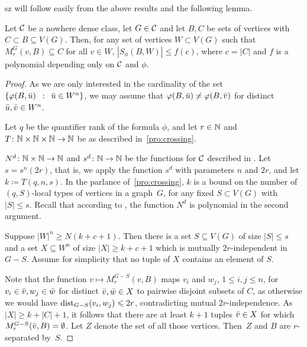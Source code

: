 \begin{change}{sz}
	 will follow easily from the above results and the following lemma.
\begin{lemma}\label{lem:num-types-same-class}
 Let $\mathcal{C}$ be a nowhere dense class,
let $G\in\mathcal{C}$ and let $B,C$ be sets of vertices with
$C\subset B\subseteq V(G)$.
Then, for any set of vertices $W\subset V(G)$ such that 
$M_r^G(v,B)\subseteq C$ for all $v\in W$, 
 $|S_\phi(B,W)|\le f(c)$, where $c=|C|$ and $f$ is a polynomial depending only on $\mathcal{C}$ and $\phi$.
\end{lemma}

\begin{proof}
As we are only interested in the cardinality of the set $\left\{\varphi(B,\bar{u}) \,~:~\, \bar{u}\in W^n \right\}$,
we may assume  that $\varphi(B,\bar{u})\neq \varphi(B,\bar{v})$ 
for distinct $\bar{u}, \bar{v}\in W^n$.


Let $q$ be the quantifier rank of the formula $\phi$,
and let $r\in \mathbb{N}$ and~$T\colon \mathbb{N}\times \mathbb{N}\times \mathbb{N}\to \mathbb{N}$  
be as described in~\cref{pro:crossing}.

$N^d\colon \mathbb{N}\times\mathbb{N}\to\mathbb{N}$ and $s^d\colon \mathbb{N}\to\mathbb{N}$ be
the functions for $\mathcal{C}$ described in . 
Let $s=s^n(2r)$, that is, we apply the function $s^d$ with
parameters $n$ and $2r$, and let $k\coloneqq T(q,n,s)$. In the parlance of~\cref{pro:crossing},
$k$ is a bound on the number of $(q,S)$-local types of vertices in a graph~$G$,
for any fixed $S\subset V(G)$ with $|S|\le s$. Recall that according
to , the function $N^d$ is polynomial in the second
argument. 

Suppose $|W|^n\geq N(k+c+1)$. Then there is a  
set $S\subseteq V(G)$ of size $|S|\leq s$ 
and a set $X\subseteq W^n$ of size $|X|\geq k+c+1$ which is 
mutually $2r$-independent in $G-S$. Assume for simplicity
that no tuple of $X$ contains an element of $S$. 

Note that the function
 $v\mapsto M_r^{G-S}(v,B)$ 
 maps $v_i$ and $w_j$, 
 $1\leq i,j\leq n$, for $v_i\in \bar{v}, w_j\in \bar{w}$ for distinct $\bar{v},\bar{w}\in X$ 
 to pairwise disjoint subsets of $C$,
as otherwise we would have \mbox{$\mathrm{dist}_{G-S}(v_i,w_j)\leqslant 2r$},
contradicting mutual $2r$-independence.
As  $|X|\ge k+|C|+1$, it follows that 
there are at least $k+1$ tuples $\bar{v}\in X$
for which ${M_r^{G-S}(\bar{v},B)=\emptyset}$. Let $Z$ denote the set of all those vertices. Then~$Z$ and $B$ are $r$-separated by~$S$.


\end{proof}
\end{change}
